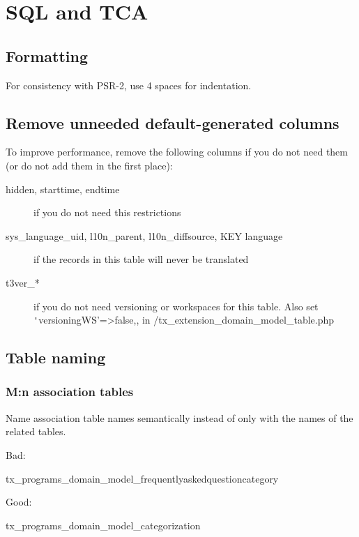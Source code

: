 \chapter{SQL and TCA}

\section{Formatting}
For consistency with PSR-2, use 4 spaces for indentation.

\section{Remove unneeded default-generated columns}

To improve performance, remove the following columns if you do not need them (or do not add them in the first place):

\begin{description}
  \item[hidden, starttime, endtime] if you do not need this restrictions
  \item[sys\_language\_uid, l10n\_parent, l10n\_diffsource, KEY language] if the records in this table will never be translated
  \item[t3ver\_*] if you do not need versioning or workspaces for this table. Also set \texttt'versioningWS'=>false,, in \textttTCA/tx_extension_domain_model_table.php
\end{description}


\section{Table naming}

\subsection{M:n association tables}

Name association table names semantically instead of only with the names of the related tables.

Bad:

\begin{sqlcode}
tx_programs_domain_model_frequentlyaskedquestioncategory
\end{sqlcode}

Good:

\begin{sqlcode}
tx_programs_domain_model_categorization
\end{sqlcode}


